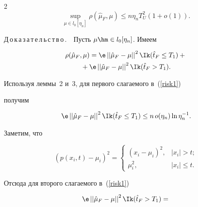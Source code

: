 \begin{multicols}{2}
$$

\sup\limits_{\mu\in l_0[\eta_n]}\rho(\hat{\mu}_F, \mu)  \leq n \eta_n T_U^2 (1+o(1)).

$$





\noindent

Д\,о\,к\,а\,з\,а\,т\,е\,л\,ь\,с\,т\,в\,о\,.\ \ Пусть $\mu \hm\in l_0[\eta_n]$. Имеем

\begin{multline}

\label{risk1}

\rho(\hat{\mu}_F, \mu) = \e \left|\left| \hat{\mu}_F - \mu\right|\right|^2 

\Ik(\hat{t}_F\leq T_1) + {}\\

{}+\e \left|\left| \hat{\mu}_F - \mu\right|\right|^2 

\Ik(\hat{t}_F > T_1).

\end{multline}

Используя леммы~2 и~3, для первого слагаемого в~(\ref{risk1}) 

получим

\begin{equation}

\label{proof1}

\e \left|\left| \hat{\mu}_F - \mu\right|\right|^2 \Ik(\hat{t}_F\leq T_1) \leq n 

\, o(\eta_n) \ln \eta_n^{-1}.

\end{equation}

Заметим, что

\begin{equation*}

\left(p(x_i, t)-\mu_i\right)^2 =

 \begin{cases}

   (x_i-\mu_i)^2, & |x_i| > t;\\

   \mu_i^2, & |x_i| \leq t.

 \end{cases}

\end{equation*}

Отсюда для второго слагаемого в~(\ref{risk1})

\begin{multline*}

\e \left|\left| \hat{\mu}_F - \mu\right|\right|^2 \Ik(\hat{t}_F > T_1) = {}\\


\end{multline*}
\end{multicols}
